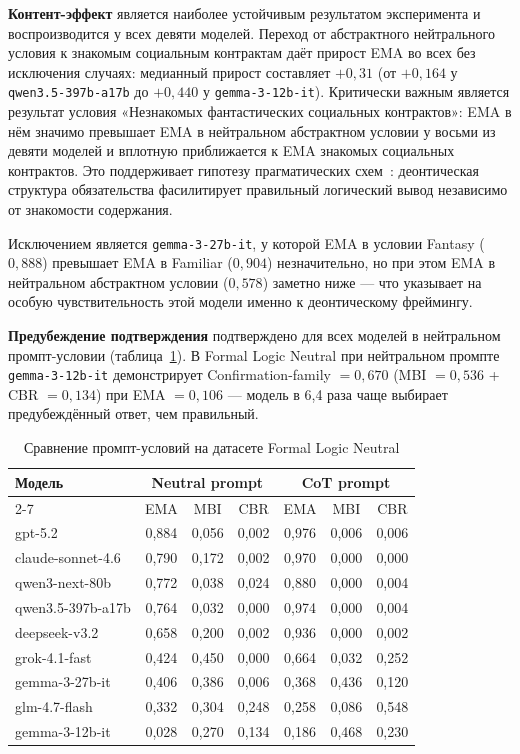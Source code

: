\textbf{Контент-эффект} является наиболее устойчивым результатом эксперимента и воспроизводится у всех девяти моделей. Переход от абстрактного нейтрального условия к знакомым социальным контрактам даёт прирост EMA во всех без исключения случаях: медианный прирост составляет $+0{,}31$ (от $+0{,}164$ у \texttt{qwen3.5-397b-a17b} до $+0{,}440$ у \texttt{gemma-3-12b-it}). Критически важным является результат условия «Незнакомых фантастических социальных контрактов»: EMA в нём значимо превышает EMA в нейтральном абстрактном условии у восьми из девяти моделей и вплотную приближается к EMA знакомых социальных контрактов. Это поддерживает гипотезу прагматических схем~\cite{cheng1985pragmatic}: деонтическая структура обязательства фасилитирует правильный логический вывод независимо от знакомости содержания.

Исключением является \texttt{gemma-3-27b-it}, у которой EMA в условии Fantasy ($0{,}888$) превышает EMA в Familiar ($0{,}904$) незначительно, но при этом EMA в нейтральном абстрактном условии ($0{,}578$) заметно ниже --- что указывает на особую чувствительность этой модели именно к деонтическому фреймингу.

\textbf{Предубеждение подтверждения} подтверждено для всех моделей в нейтральном промпт-условии (таблица~\ref{tab:wst_prompts}). В Formal Logic Neutral при нейтральном промпте \texttt{gemma-3-12b-it} демонстрирует Confirmation-family $= 0{,}670$ (MBI $= 0{,}536$ + CBR $= 0{,}134$) при EMA $= 0{,}106$ --- модель в 6,4 раза чаще выбирает предубеждённый ответ, чем правильный.

\begin{table}[h!]
\caption{Сравнение промпт-условий на датасете Formal Logic Neutral}
\label{tab:wst_prompts}
\centering
\begin{tabular}{|l|c|c|c|c|c|c|}
\hline
\multirow{2}{*}{\textbf{Модель}} & \multicolumn{3}{c|}{\textbf{Neutral prompt}} & \multicolumn{3}{c|}{\textbf{CoT prompt}} \\
\cline{2-7}
 & EMA & MBI & CBR & EMA & MBI & CBR \\
\hline
gpt-5.2            & 0,884 & 0,056 & 0,002 & 0,976 & 0,006 & 0,006 \\
claude-sonnet-4.6  & 0,790 & 0,172 & 0,002 & 0,970 & 0,000 & 0,000 \\
qwen3-next-80b     & 0,772 & 0,038 & 0,024 & 0,880 & 0,000 & 0,004 \\
qwen3.5-397b-a17b  & 0,764 & 0,032 & 0,000 & 0,974 & 0,000 & 0,004 \\
deepseek-v3.2      & 0,658 & 0,200 & 0,002 & 0,936 & 0,000 & 0,002 \\
grok-4.1-fast      & 0,424 & 0,450 & 0,000 & 0,664 & 0,032 & 0,252 \\
gemma-3-27b-it     & 0,406 & 0,386 & 0,006 & 0,368 & 0,436 & 0,120 \\
glm-4.7-flash      & 0,332 & 0,304 & 0,248 & 0,258 & 0,086 & 0,548 \\
gemma-3-12b-it     & 0,028 & 0,270 & 0,134 & 0,186 & 0,468 & 0,230 \\
\hline
\end{tabular}
\end{table}

